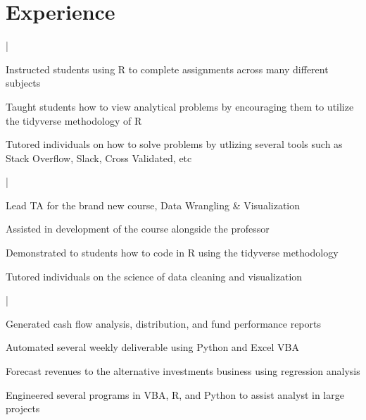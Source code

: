 \documentclass[letterpaper]{deedy-resume}
\begin{document}
\begin{minipage}[t]{0.65\textwidth} 
\section{Experience}

 |
\vspace{\topsep} 
\begin{tightitemize}
  \item Instructed students using R to complete assignments across many different subjects \\
  \item Taught students how to view analytical problems by encouraging them to utilize the tidyverse methodology of R \\
  \item Tutored individuals on how to solve problems by utlizing several tools such as Stack Overflow, Slack, Cross Validated, etc
\end{tightitemize}

\sectionspace 

 |
\begin{tightitemize}
  \item Lead TA for the brand new course, Data Wrangling \& Visualization \\
  \item Assisted in development of the course alongside the professor\\
  \item Demonstrated to students how to code in R using the tidyverse methodology \\
  \item Tutored individuals on the science of data cleaning and visualization
\end{tightitemize}

\sectionspace 

 |
\begin{tightitemize}
  \item Generated cash flow analysis, distribution, and fund performance reports\\
  \item Automated several weekly deliverable using Python and Excel VBA \\
  \item Forecast revenues to the alternative investments business using regression analysis \\
  \item Engineered several programs in VBA, R, and Python to assist analyst in large projects
\end{tightitemize}


\end{minipage}
\end{document}
